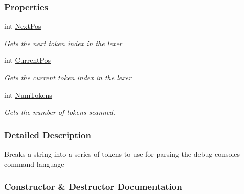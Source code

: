 \subsubsection*{Properties}
\begin{DoxyCompactItemize}
\item 
int \hyperlink{class_m_b2_d_1_1_m_b_console_lexer_aa3535c7e87e9d7855e3fb7848bf46ba8}{Next\+Pos}
\begin{DoxyCompactList}\small\item\em Gets the next token index in the lexer \end{DoxyCompactList}\item 
int \hyperlink{class_m_b2_d_1_1_m_b_console_lexer_a15d3752a0f36b998985befdabfdb475e}{Current\+Pos}
\begin{DoxyCompactList}\small\item\em Gets the current token index in the lexer \end{DoxyCompactList}\item 
int \hyperlink{class_m_b2_d_1_1_m_b_console_lexer_ae91f360dd9246d226468c79f7322413f}{Num\+Tokens}
\begin{DoxyCompactList}\small\item\em Gets the number of tokens scanned. \end{DoxyCompactList}\end{DoxyCompactItemize}


\subsubsection{Detailed Description}
Breaks a string into a series of tokens to use for parsing the debug consoles command language 



\subsubsection{Constructor \& Destructor Documentation}
\hypertarget{class_m_b2_d_1_1_m_b_console_lexer_aa78375766c0612494a148a55814b4b7e}{}\label{class_m_b2_d_1_1_m_b_console_lexer_aa78375766c0612494a148a55814b4b7e} 
